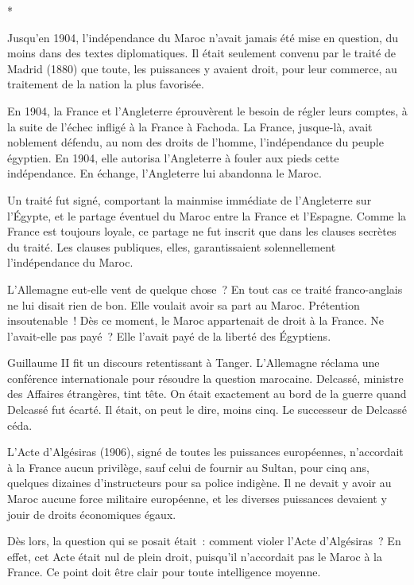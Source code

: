 \documentclass[french,twoside]{book} %
\begin{document}
\begin{center}
*\end{center}
\noindent Jusqu'en 1904, l'indépendance du Maroc n'avait jamais été mise en question, du moins dans des textes diplomatiques. Il était seulement convenu par le traité de Madrid (1880) que toute, les puissances y avaient droit, pour leur commerce, au traitement de la nation la plus favorisée.\par
En 1904, la France et l'Angleterre éprouvèrent le besoin de régler leurs comptes, à la suite de l'échec infligé à la France à Fachoda. La France, jusque-là, avait noblement défendu, au nom des droits de l'homme, l'indépendance du peuple égyptien. En 1904, elle autorisa l'Angleterre à fouler aux pieds cette indépendance. En échange, l'Angleterre lui abandonna le Maroc.\par
Un traité fut signé, comportant la mainmise immédiate de l'Angleterre sur l'Égypte, et le partage éventuel du Maroc entre la France et l'Espagne. Comme la France est toujours loyale, ce partage ne fut inscrit que dans les clauses secrètes du traité. Les clauses publiques, elles, garantissaient solennellement l'indépendance du Maroc.\par
L'Allemagne eut-elle vent de quelque chose ? En tout cas ce traité franco-anglais ne lui disait rien de bon. Elle voulait avoir sa part au Maroc. Prétention insoutenable ! Dès ce moment, le Maroc appartenait de droit à la France. Ne l'avait-elle pas payé ? Elle l'avait payé de la liberté des Égyptiens.\par
Guillaume II fit un discours retentissant à Tanger. L'Allemagne réclama une conférence internationale pour résoudre la question marocaine. Delcassé, ministre des Affaires étrangères, tint tête. On était exactement au bord de la guerre quand Delcassé fut écarté. Il était, on peut le dire, moins cinq. Le successeur de Delcassé céda.\par
L'Acte d'Algésiras (1906), signé de toutes les puissances européennes, n'accordait à la France aucun privilège, sauf celui de fournir au Sultan, pour cinq ans, quelques dizaines d'instructeurs pour sa police indigène. Il ne devait y avoir au Maroc aucune force militaire européenne, et les diverses puissances devaient y jouir de droits économiques égaux.\par
Dès lors, la question qui se posait était : comment violer l'Acte d'Algésiras ? En effet, cet Acte était nul de plein droit, puisqu'il n'accordait pas le Maroc à la France. Ce point doit être clair pour toute intelligence moyenne.\par
\end{document}

